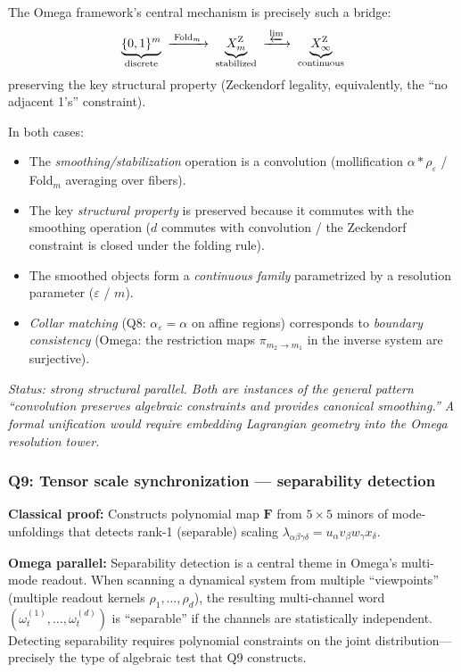 The Omega framework's central mechanism is precisely such a bridge:
\[
\underbrace{\{0,1\}^m}_{\text{discrete}}
\;\xrightarrow{\;\mathrm{Fold}_m\;}\;
\underbrace{X^{\mathrm Z}_m}_{\text{stabilized}}
\;\xrightarrow{\;\varprojlim\;}\;
\underbrace{X^{\mathrm Z}_\infty}_{\text{continuous}}
\]
preserving the key structural property (Zeckendorf legality,
equivalently, the ``no adjacent 1's'' constraint).

In both cases:
\begin{itemize}[nosep]
\item The \emph{smoothing/stabilization} operation is a convolution
  (mollification $\alpha\ast\rho_\varepsilon$ / Fold$_m$ averaging
  over fibers).
\item The key \emph{structural property} is preserved because it
  commutes with the smoothing operation ($d$ commutes with convolution /
  the Zeckendorf constraint is closed under the folding rule).
\item The smoothed objects form a \emph{continuous family} parametrized
  by a resolution parameter ($\varepsilon$ / $m$).
\item \emph{Collar matching} (Q8: $\alpha_\varepsilon=\alpha$ on
  affine regions) corresponds to \emph{boundary consistency}
  (Omega: the restriction maps $\pi_{m_2\to m_1}$ in the inverse system
  are surjective).
\end{itemize}

\emph{Status: strong structural parallel.  Both are instances of the
general pattern ``convolution preserves algebraic constraints and
provides canonical smoothing.''  A formal unification would require
embedding Lagrangian geometry into the Omega resolution tower.}


\subsubsection*{Q9: Tensor scale synchronization ---
  separability detection}

\noindent\textbf{Classical proof:} Constructs polynomial map $\mathbf F$
from $5\times 5$ minors of mode-unfoldings that detects rank-1
(separable) scaling $\lambda_{\alpha\beta\gamma\delta}=u_\alpha
v_\beta w_\gamma x_\delta$.

\noindent\textbf{Omega parallel:}
Separability detection is a central theme in Omega's multi-mode
readout.  When scanning a dynamical system from multiple
``viewpoints'' (multiple readout kernels $\rho_1,\dots,\rho_d$),
the resulting multi-channel word
$(\omega^{(1)}_t,\dots,\omega^{(d)}_t)$ is ``separable'' if the
channels are statistically independent.  Detecting separability
requires polynomial constraints on the joint distribution---precisely
the type of algebraic test that Q9 constructs.

